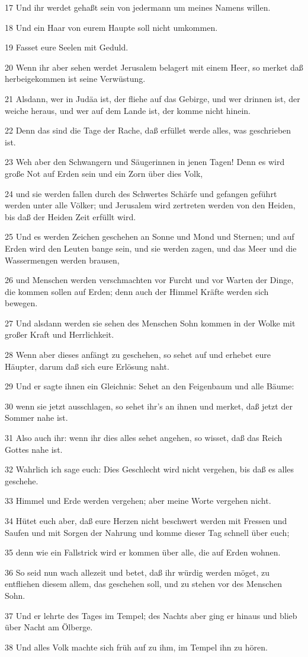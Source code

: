 \par 17 Und ihr werdet gehaßt sein von jedermann um meines Namens willen.
\par 18 Und ein Haar von eurem Haupte soll nicht umkommen.
\par 19 Fasset eure Seelen mit Geduld.
\par 20 Wenn ihr aber sehen werdet Jerusalem belagert mit einem Heer, so merket daß herbeigekommen ist seine Verwüstung.
\par 21 Alsdann, wer in Judäa ist, der fliehe auf das Gebirge, und wer drinnen ist, der weiche heraus, und wer auf dem Lande ist, der komme nicht hinein.
\par 22 Denn das sind die Tage der Rache, daß erfüllet werde alles, was geschrieben ist.
\par 23 Weh aber den Schwangern und Säugerinnen in jenen Tagen! Denn es wird große Not auf Erden sein und ein Zorn über dies Volk,
\par 24 und sie werden fallen durch des Schwertes Schärfe und gefangen geführt werden unter alle Völker; und Jerusalem wird zertreten werden von den Heiden, bis daß der Heiden Zeit erfüllt wird.
\par 25 Und es werden Zeichen geschehen an Sonne und Mond und Sternen; und auf Erden wird den Leuten bange sein, und sie werden zagen, und das Meer und die Wassermengen werden brausen,
\par 26 und Menschen werden verschmachten vor Furcht und vor Warten der Dinge, die kommen sollen auf Erden; denn auch der Himmel Kräfte werden sich bewegen.
\par 27 Und alsdann werden sie sehen des Menschen Sohn kommen in der Wolke mit großer Kraft und Herrlichkeit.
\par 28 Wenn aber dieses anfängt zu geschehen, so sehet auf und erhebet eure Häupter, darum daß sich eure Erlösung naht.
\par 29 Und er sagte ihnen ein Gleichnis: Sehet an den Feigenbaum und alle Bäume:
\par 30 wenn sie jetzt ausschlagen, so sehet ihr's an ihnen und merket, daß jetzt der Sommer nahe ist.
\par 31 Also auch ihr: wenn ihr dies alles sehet angehen, so wisset, daß das Reich Gottes nahe ist.
\par 32 Wahrlich ich sage euch: Dies Geschlecht wird nicht vergehen, bis daß es alles geschehe.
\par 33 Himmel und Erde werden vergehen; aber meine Worte vergehen nicht.
\par 34 Hütet euch aber, daß eure Herzen nicht beschwert werden mit Fressen und Saufen und mit Sorgen der Nahrung und komme dieser Tag schnell über euch;
\par 35 denn wie ein Fallstrick wird er kommen über alle, die auf Erden wohnen.
\par 36 So seid nun wach allezeit und betet, daß ihr würdig werden möget, zu entfliehen diesem allem, das geschehen soll, und zu stehen vor des Menschen Sohn.
\par 37 Und er lehrte des Tages im Tempel; des Nachts aber ging er hinaus und blieb über Nacht am Ölberge.
\par 38 Und alles Volk machte sich früh auf zu ihm, im Tempel ihn zu hören.

